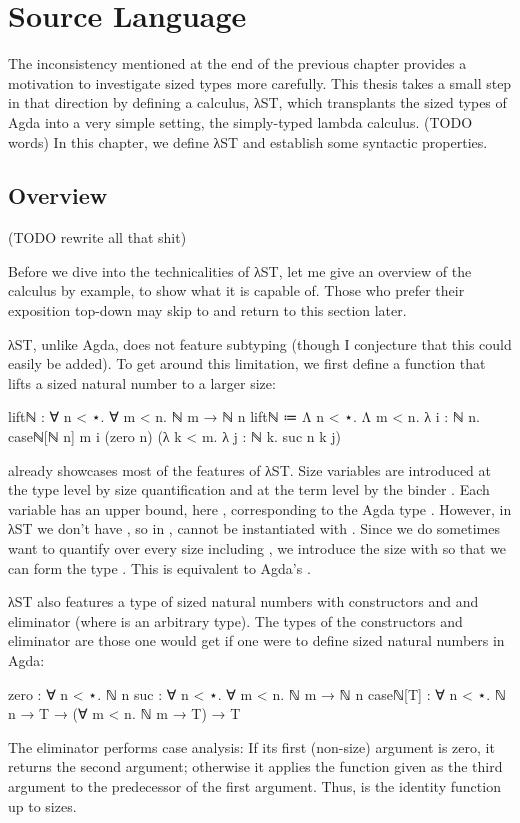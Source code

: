 \chapter{Source Language}
\label{sec:source}

The inconsistency mentioned at the end of the previous chapter provides a
motivation to investigate sized types more carefully. This thesis takes a small
step in that direction by defining a calculus, λST, which transplants the sized
types of Agda into a very simple setting, the simply-typed lambda calculus.
(TODO words) In this chapter, we define λST and establish some syntactic
properties.


\section{Overview}
\label{sec:source:overview}

(TODO rewrite all that shit)

Before we dive into the technicalities of λST, let me give an overview of the
calculus by example, to show what it is capable of. Those who prefer their
exposition top-down may skip to  and return to this section
later.

λST, unlike Agda, does not feature subtyping (though I conjecture that this
could easily be added). To get around this limitation, we first define a
function that lifts a sized natural number to a larger size:
\begin{code}
  liftℕ : ∀ n < ⋆. ∀ m < n. ℕ m → ℕ n
  liftℕ ≔ Λ n < ⋆. Λ m < n. λ i : ℕ n.
          caseℕ[ℕ n] m i
            (zero n)
            (λ k < m. λ j : ℕ k. suc n k j)
\end{code}

 already showcases most of the features of λST. Size variables are
introduced at the type level by size quantification  and at
the term level by the binder . Each variable has an upper
bound, here , corresponding to the Agda type . However,
in λST we don't have , so in ,  cannot
be instantiated with . Since we do sometimes want to quantify over
every size including , we introduce the size  with
 so that we can form the type . This is
equivalent to Agda's .

λST also features a type of sized natural numbers  with constructors
 and  and eliminator  (where  is
an arbitrary type). The types of the constructors and eliminator are those one
would get if one were to define sized natural numbers in Agda:
\begin{code}
  zero     : ∀ n < ⋆. ℕ n
  suc      : ∀ n < ⋆. ∀ m < n. ℕ m → ℕ n
  caseℕ[T] : ∀ n < ⋆. ℕ n → T → (∀ m < n. ℕ m → T) → T
\end{code}
The  eliminator performs case analysis: If its first (non-size)
argument is zero, it returns the second argument; otherwise it applies the
function given as the third argument to the predecessor of the first argument.
Thus,  is the identity function up to sizes.

